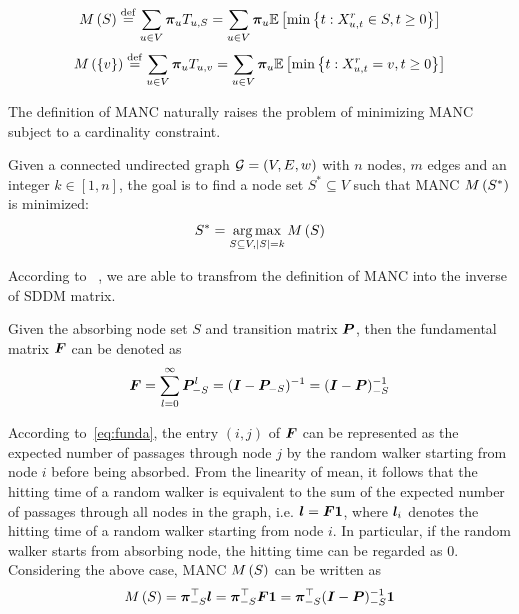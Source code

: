 \documentclass[sigconf]{acmart}
\begin{document}
\begin{definition}\label{def:manc}
    \[M\left(S\right)\stackrel{\mathrm{def}}{=}\sum_{u\in V}\boldsymbol{\pi}_u T_{u,S}=\sum_{u\in V}\boldsymbol{\pi}_u \mathbb{E}\left[\min\left\{t:X_{u,t}^r\in S,t\ge0 \right\}\right]\]
    \[M\left(\left\{v \right\}\right)\stackrel{\mathrm{def}}{=}\sum_{u\in V}\boldsymbol{\pi}_u T_{u,v}=\sum_{u\in V}\boldsymbol{\pi}_u\mathbb{E}\left[\min\left\{t:X_{u,t}^r=v,t\ge0 \right\}\right]\]
\end{definition}

The definition of MANC naturally raises the problem of minimizing MANC subject to a cardinality constraint.

\begin{problem}
Given a connected undirected graph \(\mathcal{G}=(V,E,w)\) with \(n\) nodes, \(m\) edges and an integer \(k\in[1,n]\), the goal is to find a node set \(S^*\subseteq V\) such that MANC \(M\left(S^*\right)\) is minimized:
\[S^*=\operatorname*{arg\,max}_{S\subseteq V,\left|S \right|=k}M\left(S\right)\]
\end{problem}

According to ~\cite{KeSn76}, we are able to transfrom the definition of MANC into the inverse of SDDM matrix.

\begin{fact}
    Given the absorbing node set \(S\) and transition matrix \(\boldsymbol{P}\), then the fundamental matrix \(\boldsymbol{F}\) can be denoted as
    \begin{equation}\label{eq:funda}
        \boldsymbol{F}=\sum_{l=0}^\infty\boldsymbol{P}_{-S}^l=(\boldsymbol{I}-\boldsymbol{P}_{-S})^{-1}=(\boldsymbol{I}-\boldsymbol{P})_{-S}^{-1}
    \end{equation}
\end{fact}

According to~\eqref{eq:funda}, the entry \((i,j)\) of \(\boldsymbol{F}\) can be represented as the expected number of passages through node \(j\) by the random walker starting from node \(i\) before being absorbed.
From the linearity of mean, it follows that the hitting time of a random walker is equivalent to the sum of the expected number of passages through all nodes in the graph, i.e. \(\boldsymbol{l}=\boldsymbol{F}\boldsymbol{1}\), where \(\boldsymbol{l}_i\) denotes the hitting time of a random walker starting from node \(i\).
In particular, if the random walker starts from absorbing node, the hitting time can be regarded as \(0\). Considering the above case, MANC \(M\left(S\right)\) can be written as
\[M\left(S\right)=\boldsymbol{\pi}_{-S}^\top\boldsymbol{l}=\boldsymbol{\pi}_{-S}^\top\boldsymbol{F}\boldsymbol{1}=\boldsymbol{\pi}_{-S}^\top(\boldsymbol{I}-\boldsymbol{P})_{-S}^{-1}\boldsymbol{1}\]
\end{document}
